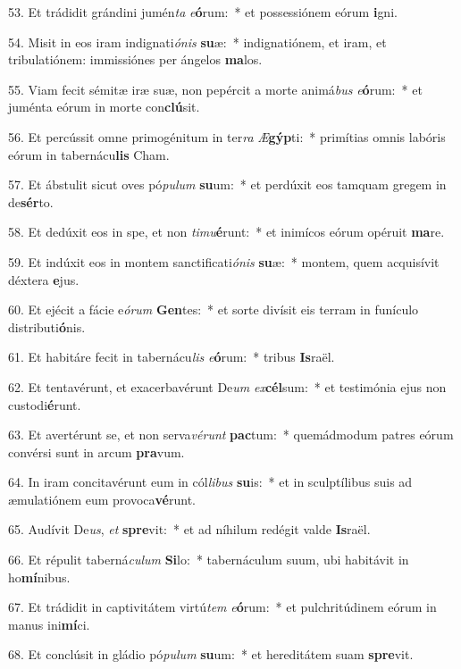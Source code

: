 53. Et trádidit grándini jumén\textit{ta} \textit{e}\textbf{ó}rum:~*  et possessiónem eórum \textbf{i}gni.\

54. Misit in eos iram indignati\textit{ó}\textit{nis} \textbf{su}æ:~*  indignatiónem, et iram, et tribulatiónem: immissiónes per ángelos \textbf{ma}los.\

55. Viam fecit sémitæ iræ suæ, non pepércit a morte animá\textit{bus} \textit{e}\textbf{ó}rum:~*  et juménta eórum in morte con\textbf{clú}sit.\

56. Et percússit omne primogénitum in ter\textit{ra} \textit{Æ}\textbf{gýp}ti:~*  primítias omnis labóris eórum in tabernácu\textbf{lis} Cham.\

57. Et ábstulit sicut oves pó\textit{pu}\textit{lum} \textbf{su}um:~*  et perdúxit eos tamquam gregem in de\textbf{sér}to.\

58. Et dedúxit eos in spe, et non \textit{ti}\textit{mu}\textbf{é}runt:~*  et inimícos eórum opéruit \textbf{ma}re.\

59. Et indúxit eos in montem sanctificati\textit{ó}\textit{nis} \textbf{su}æ:~*  montem, quem acquisívit déxtera \textbf{e}jus.\

60. Et ejécit a fácie e\textit{ó}\textit{rum} \textbf{Gen}tes:~*  et sorte divísit eis terram in funículo distributi\textbf{ó}nis.\

61. Et habitáre fecit in tabernácu\textit{lis} \textit{e}\textbf{ó}rum:~*  tribus \textbf{Is}raël.\

62. Et tentavérunt, et exacerbavérunt De\textit{um} \textit{ex}\textbf{cél}sum:~*  et testimónia ejus non custodi\textbf{é}runt.\

63. Et avertérunt se, et non serva\textit{vé}\textit{runt} \textbf{pac}tum:~*  quemádmodum patres eórum convérsi sunt in arcum \textbf{pra}vum.\

64. In iram concitavérunt eum in cól\textit{li}\textit{bus} \textbf{su}is:~*  et in sculptílibus suis ad æmulatiónem eum provoca\textbf{vé}runt.\

65. Audívit De\textit{us}, \textit{et} \textbf{spre}vit:~*  et ad níhilum redégit valde \textbf{Is}raël.\

66. Et répulit taberná\textit{cu}\textit{lum} \textbf{Si}lo:~*  tabernáculum suum, ubi habitávit in ho\textbf{mí}nibus.\

67. Et trádidit in captivitátem virtú\textit{tem} \textit{e}\textbf{ó}rum:~*  et pulchritúdinem eórum in manus ini\textbf{mí}ci.\

68. Et conclúsit in gládio pó\textit{pu}\textit{lum} \textbf{su}um:~*  et hereditátem suam \textbf{spre}vit.\

